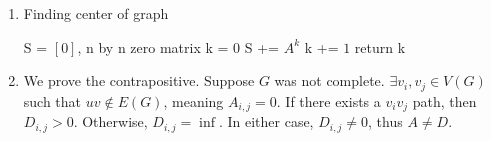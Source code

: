 \documentclass[11pt]{article}
\begin{document}
\begin{enumerate}[1]
    \item %
        \begin{algorithm}
            \caption{Finding center of graph}
        \begin{algorithmic}[1]
            \State S = $[0]$, n by n zero matrix
            \State k = 0
            \State S += $A^k$
            \State k += $1$
            \EndWhile
            \State return k 
        \end{algorithmic}
        \end{algorithm}

    \item %
        We prove the contrapositive. Suppose $G$ was not complete. $\exists v_i,v_j 
        \in V(G)$ such that $uv \notin E(G)$, meaning $A_{i,j} = 0$. If there exists
        a $v_iv_j$ path, then $D_{i, j} > 0$. Otherwise, $D_{i, j} = \inf$. In either
        case, $D_{i, j} \neq 0$, thus $A \neq D$. 

        
\end{enumerate}
\end{document}
